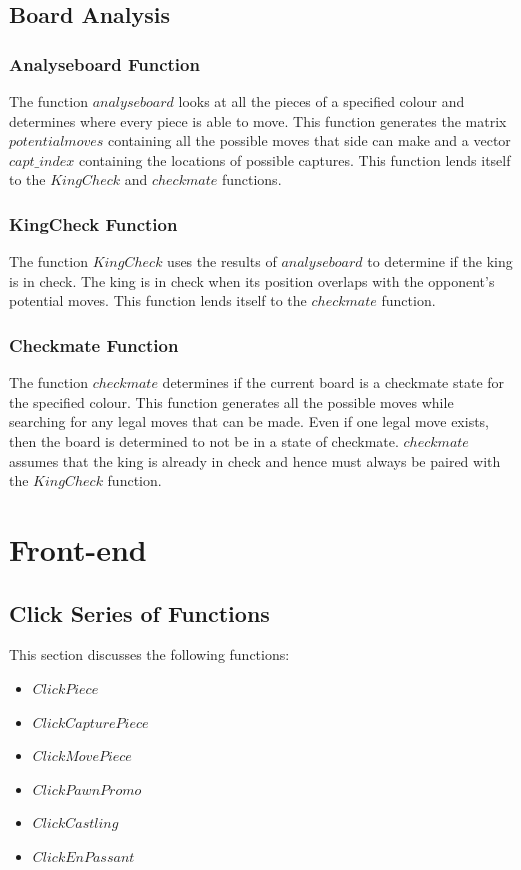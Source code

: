 \documentclass[11pt,a4paper]{article}
\begin{document}
\subsection{Board Analysis}
\subsubsection{Analyseboard Function}
The function $analyseboard$ looks at all the pieces of a specified colour and determines where every piece is able to move. This function generates the matrix $potentialmoves$ containing all the possible moves that side can make and a vector $capt\_index$ containing the locations of possible captures. 
This function lends itself to the $KingCheck$ and $checkmate$ functions.

\subsubsection{KingCheck Function}
The function $KingCheck$ uses the results of $analyseboard$ to determine if the king is in check. The king is in check when its position overlaps with the opponent’s potential moves. This function lends itself to the $checkmate$ function.

\subsubsection{Checkmate Function}
The function $checkmate$ determines if the current board is a checkmate state for the specified colour. This function generates all the possible moves while searching for any legal moves that can be made. Even if one legal move exists, then the board is determined to not be in a state of checkmate.
\newline
$checkmate$ assumes that the king is already in check and hence must always be paired with the $KingCheck$ function.


\newpage
\section{Front-end}

\subsection{Click Series of Functions}

This section discusses the following functions: 
\begin{itemize}
\item $ClickPiece$
\item $ClickCapturePiece$
\item $ClickMovePiece$
\item $ClickPawnPromo$
\item $ClickCastling$
\item $ClickEnPassant$
\end{itemize}
\end{document}
